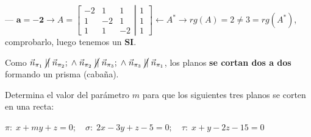 --- $\boldsymbol{a=-2} \to 
A=\left[ \begin{matrix} \boxed{-2}& \boxed{1}&1\\ \boxed{1}& \boxed{-2}&1\\1&1&-2 \end{matrix} \right. \left| \begin{matrix} 1\\1\\1 \end{matrix} \right] \leftarrow A^* \to rg(A)=2 \neq 3=rg(A^*)$, comprobarlo, luego tenemos un $\boldsymbol{SI}$.

\noindent Como $\vec n_{\pi_{1}}\;\cancel{||}\;\vec n_{\pi_{2}};\; \wedge \; \vec n_{\pi_{2}}\;\cancel{||}\;\vec n_{\pi_{3}};\; \wedge \; \vec n_{\pi_{3}}\;\cancel{||}\;\vec n_{\pi_{1}}$, los planos \textbf{se cortan dos a dos} formando un prisma (cabaña).



\begin{ejre}
	Determina el valor del parámetro $m$ para que los siguientes tres planos se corten en una recta:
	
	$\pi:\; x+my+z=0;\quad \sigma:\; 2x-3y+z-5=0;\quad \tau:\; x+y-2z-15=0$
\end{ejre}

